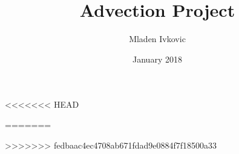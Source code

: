 




\title{Advection Project}


\author[M. Ivkovic]{Mladen Ivkovic}
<<<<<<< HEAD
\date{January 2018} 
=======
\date{} 
>>>>>>> fedbaac4ec4708ab671fdad9e0884f7f18500a33











